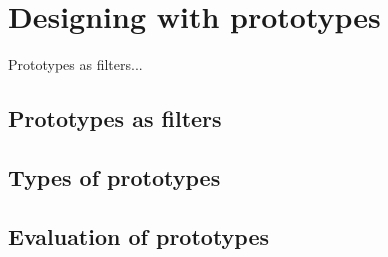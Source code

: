 \section{Designing with prototypes} \label{sec:prototyping}
Prototypes as filters... \cite{lim}

\subsection{Prototypes as filters}


\subsection{Types of prototypes}



\subsection{Evaluation of prototypes}
